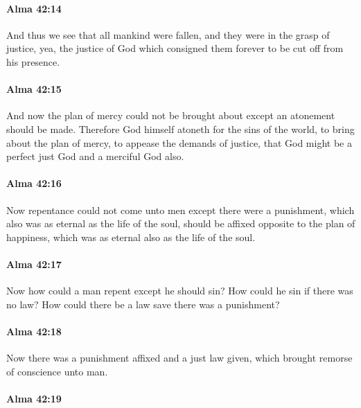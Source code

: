 		\paragraph{Alma 42:14} %
			\label{ALMA-42-14}

			And thus we see that all mankind were fallen,
			and they were in the grasp of justice,
			yea, the justice of God which consigned them forever
			to be cut off from his presence.

		\paragraph{Alma 42:15} %
			\label{ALMA-42-15}

			And now the plan of mercy could not be brought about
			except an atonement should be made.
			Therefore God himself atoneth for the sins of the world,
			to bring about the plan of mercy,
			to appease the demands of justice,
			that God might be a perfect just God and a merciful God also.

		\paragraph{Alma 42:16} %
			\label{ALMA-42-16}

			Now repentance could not come unto men
			except there were a punishment,
			which also was as eternal as the life of the soul,
			should be affixed opposite to the plan of happiness,
			which was as eternal also as the life of the soul.

		\paragraph{Alma 42:17} %
			\label{ALMA-42-17}

			Now how could a man repent except he should sin?
			How could he sin if there was no law?
			How could there be a law save there was a punishment?

		\paragraph{Alma 42:18} %
			\label{ALMA-42-18}

			Now there was a punishment affixed and a just law given,
			which brought remorse of conscience unto man.

		\paragraph{Alma 42:19} %
			\label{ALMA-42-19}

